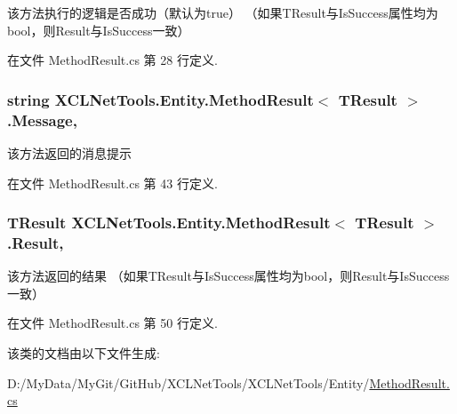 该方法执行的逻辑是否成功（默认为true） （如果\-T\-Result与\-Is\-Success属性均为bool，则\-Result与\-Is\-Success一致） 



在文件 Method\-Result.\-cs 第 28 行定义.

\hypertarget{class_x_c_l_net_tools_1_1_entity_1_1_method_result_3_01_t_result_01_4_a475362b3bdd578fb2b98befa28355b2b}{
\subsubsection[{Message}]{\setlength{\rightskip}{0pt plus 5cm}string X\-C\-L\-Net\-Tools.\-Entity.\-Method\-Result$<$ T\-Result $>$.Message\hspace{0.3cm}{\ttfamily [get]}, {\ttfamily [set]}}}\label{class_x_c_l_net_tools_1_1_entity_1_1_method_result_3_01_t_result_01_4_a475362b3bdd578fb2b98befa28355b2b}


该方法返回的消息提示 



在文件 Method\-Result.\-cs 第 43 行定义.

\hypertarget{class_x_c_l_net_tools_1_1_entity_1_1_method_result_3_01_t_result_01_4_aa4bccee54c4cec1d31ab291cc020f4c3}{
\subsubsection[{Result}]{\setlength{\rightskip}{0pt plus 5cm}T\-Result X\-C\-L\-Net\-Tools.\-Entity.\-Method\-Result$<$ T\-Result $>$.Result\hspace{0.3cm}{\ttfamily [get]}, {\ttfamily [set]}}}\label{class_x_c_l_net_tools_1_1_entity_1_1_method_result_3_01_t_result_01_4_aa4bccee54c4cec1d31ab291cc020f4c3}


该方法返回的结果 （如果\-T\-Result与\-Is\-Success属性均为bool，则\-Result与\-Is\-Success一致） 



在文件 Method\-Result.\-cs 第 50 行定义.



该类的文档由以下文件生成\-:\begin{DoxyCompactItemize}
\item 
D\-:/\-My\-Data/\-My\-Git/\-Git\-Hub/\-X\-C\-L\-Net\-Tools/\-X\-C\-L\-Net\-Tools/\-Entity/\hyperlink{_method_result_8cs}{Method\-Result.\-cs}\end{DoxyCompactItemize}
